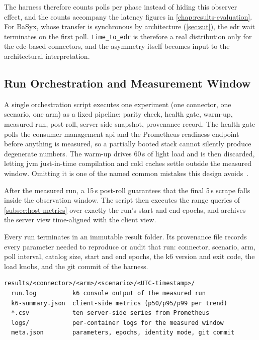 The harness therefore counts polls per phase instead of hiding this observer effect, and the counts accompany the latency figures in \cref{chap:results-evaluation}. For BaSyx, whose transfer is synchronous by architecture (\cref{sec:sut}), the \gls{edr} wait terminates on the first poll. \texttt{time\_to\_edr} is therefore a real distribution only for the \gls{edc}-based connectors, and the asymmetry itself becomes input to the architectural interpretation.

\subsection{Run Orchestration and Measurement Window}\label{subsec:orchestration}

A single orchestration script executes one experiment (one connector, one scenario, one arm) as a fixed pipeline: parity check, health gate, warm-up, measured run, post-roll, server-side snapshot, provenance record. The health gate polls the consumer management \gls{api} and the Prometheus readiness endpoint before anything is measured, so a partially booted stack cannot silently produce degenerate numbers. The warm-up drives 60\,s of light load and is then discarded, letting \gls{jvm} just-in-time compilation and cold caches settle outside the measured window. Omitting it is one of the named common mistakes this design avoids~\citep{jain1991art}.

After the measured run, a 15\,s post-roll guarantees that the final 5\,s scrape falls inside the observation window. The script then executes the range queries of \cref{subsec:host-metrics} over exactly the run's start and end epochs, and archives the server view time-aligned with the client view.

Every run terminates in an immutable result folder. Its provenance file records every parameter needed to reproduce or audit that run: connector, scenario, arm, poll interval, catalog size, start and end epochs, the k6 version and exit code, the load knobs, and the git commit of the harness.

\begin{lstlisting}[numbers=none, basicstyle=\scriptsize\ttfamily, columns=fixed, caption={Per-run result folder produced by the orchestration script.}, label=lst:result-folder]
results/<connector>/<arm>/<scenario>/<UTC-timestamp>/
  run.log          k6 console output of the measured run
  k6-summary.json  client-side metrics (p50/p95/p99 per trend)
  *.csv            ten server-side series from Prometheus
  logs/            per-container logs for the measured window
  meta.json        parameters, epochs, identity mode, git commit
\end{lstlisting}

